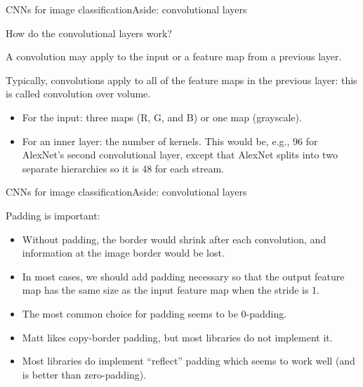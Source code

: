 \documentclass{beamer}
\begin{document}
\begin{frame}{CNNs for image classification}{Aside: convolutional layers}

  How do the convolutional layers work?

  \medskip

  A convolution may apply to the \alert{input} or \alert{a feature map
    from a previous layer}.

  \medskip

  Typically, convolutions apply to all of the feature maps in the
  previous layer: this is called \alert{convolution over volume}.
  \begin{itemize}
  \item For the input: three maps (R, G, and B) or one map (grayscale).
  \item For an inner layer: the number of kernels. This would be,
    e.g., 96 for AlexNet's second convolutional layer, except that
    AlexNet splits into two separate hierarchies so it is 48 for each
    stream.
  \end{itemize}

\end{frame}


\begin{frame}{CNNs for image classification}{Aside: convolutional layers}

  \alert{Padding} is important:
  \begin{itemize}
  \item Without padding, the border would shrink after each
    convolution, and information at the image border would be lost.
  \item In most cases, we should add padding necessary so that the
    output feature map has the same size as the input feature map when
    the stride is 1.
  \item The most common choice for padding seems to be 0-padding.
  \item Matt likes copy-border padding, but most libraries do not implement it.
  \item Most libraries do implement ``reflect'' padding which seems to
    work well (and is better than zero-padding).
  \end{itemize}
  
\end{frame}
\end{document}
